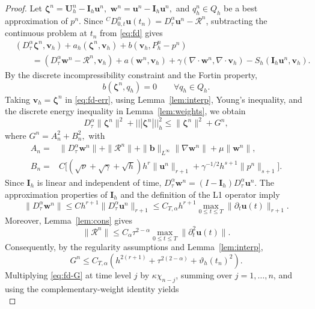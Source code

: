\documentclass[11pt,a4paper]{article}
\numberwithin{equation}{section}
\theoremstyle{plain}
\theoremstyle{definition}
\theoremstyle{remark}
\newcommand{\CD}{{}^{C}\!D_{0,t}^{\alpha}}   %
\newcommand{\nrm}[1]{|||#1|||_h}      %
\newcommand{\Dt}{D_\tau^{\alpha}}     %
\newcommand{\bmb}{\boldsymbol b}
\begin{document}
\begin{proof}
Let
$
\bm\zeta^n=\bm U_h^n-\bm I_h\bm u^n,$  
$\bm w^n=\bm u^n-\bm I_h\bm u^n,$
and $q_h^n\in Q_h$ be a best approximation
of $p^n$.
Since
$\CD\bm u(t_n)=\Dt\bm u^n-\mathcal R^n$,
subtracting the continuous problem at $t_n$
from \eqref{eq:fd} gives
\begin{equation}\label{eq:fd-err}
\begin{aligned}
&(\Dt\bm\zeta^n,\bm v_h)
+a_h(\bm\zeta^n,\bm v_h)
+b(\bm v_h,P_h^n-p^n)\\
&\qquad=
(\Dt\bm w^n-\mathcal R^n,\bm v_h)
+a(\bm w^n,\bm v_h)+
\gamma(\nabla\cdot\bm w^n,
       \nabla\cdot\bm v_h)
-S_h(\bm I_h\bm u^n,\bm v_h).
\end{aligned}
\end{equation}
%
By the discrete incompressibility constraint
and the Fortin property,
\[
b(\bm\zeta^n,q_h)=0
\qquad\forall q_h\in Q_h.
\]
Taking $\bm v_h=\bm\zeta^n$ in
\eqref{eq:fd-err}, using
Lemma~\ref{lem:interp}, Young's inequality,
and the discrete energy inequality in
Lemma~\ref{lem:weights}, we obtain
\begin{equation}\label{eq:fd-G}
\Dt\|\bm\zeta^n\|^2
+\nrm{\bm\zeta^n}^2
\le
\|\bm\zeta^n\|^2+G^n,
\end{equation}
where
$
G^n=A_n^2+B_n^2,
$
with
\[
\begin{aligned}
A_n={}&
\|\Dt\bm w^n\|
+\|\mathcal R^n\|
+\|\bmb\|_{L^\infty}\|\nabla\bm w^n\|
+\mu\|\bm w^n\|,
\\
B_n={}&C\bigl[
(\sqrt\nu+\sqrt\gamma+\sqrt h)
h^r\|\bm u^n\|_{r+1}
+\gamma^{-1/2}h^{s+1}\|p^n\|_{s+1}
\bigr].
\end{aligned}
\]
%
Since $\bm I_h$ is linear and independent of time,
$
\Dt\bm w^n=(I-\bm I_h)\Dt\bm u^n.
$
The approximation properties of $\bm I_h$
and the definition of the L1 operator imply
\[
\|\Dt\bm w^n\|
\le Ch^{r+1}\|\Dt\bm u^n\|_{r+1}
\le C_{T,\alpha}h^{r+1}
\max_{0\le t\le T}
\|\partial_t\bm u(t)\|_{r+1}.
\]
Moreover, Lemma~\ref{lem:cons} gives
\[
\|\mathcal R^n\|
\le C_\alpha\tau^{2-\alpha}
\max_{0\le t\le T}
\|\partial_t^2\bm u(t)\|.
\]
Consequently, by the regularity assumptions
and Lemma~\ref{lem:interp},
\begin{equation}\label{eq:fd-G-bound}
G^n\le C_{T,\alpha}
\left(
h^{2(r+1)}
+\tau^{2(2-\alpha)}
+\vartheta_h(t_n)^2
\right).
\end{equation}
%
Multiplying \eqref{eq:fd-G} at time level $j$
by $\kappa\chi_{n-j}$, summing over
$j=1,\ldots,n$, and using the complementary-weight
identity yields
\begin{equation}\label{eq:fd-weighted}

\end{equation}
\end{proof}
\end{document}
